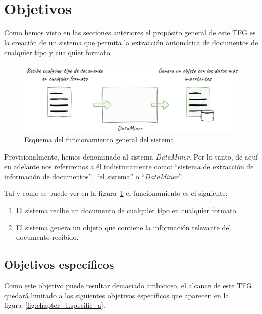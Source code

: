 \section{Objetivos}\label{sec:objetives}

Como hemos visto en las secciones anteriores el propósito general de este TFG es la creación de un sistema que permita
la extracción automática de documentos de cualquier tipo y cualquier formato.

\begin{figure}[ht]
    \begin{center}
        \includegraphics[width=\textwidth]{./chapter/1/images/chapter_1.overview}
        \caption{Esquema del funcionamiento general del sistema}
        \label{fig:chapter_1.overview}
    \end{center}
\end{figure}

Provisionalmente, hemos denominado al sistema \textit{DataMiner}.
Por lo tanto, de aquí en adelante nos referiremos a él indistintamente como: ``sistema de extracción de información de
documentos'', ``el sistema'' o ``\textit{DataMiner}''.

Tal y como se puede ver en la figura~\ref{fig:chapter_1.overview} el funcionamiento es el siguiente:

\begin{enumerate}
    \item
    El sistema recibe un documento de cualquier tipo en cualquier formato.
    \item
    El sistema genera un objeto que contiene la información relevante del documento recibido.
\end{enumerate}

\subsection*{Objetivos específicos}

Como este objetivo puede resultar demasiado ambicioso, el alcance de este TFG quedará limitado a los siguientes
objetivos específicos que aparecen en la figura~\ref{fig:chapter_1.specific_a}.

